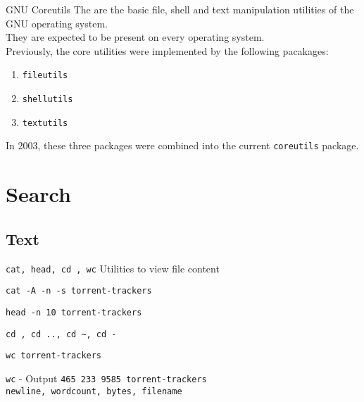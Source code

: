 \documentclass[11pt]{beamer}
\begin{document}
		\begin{frame}{GNU Coreutils}
			The {\textbf{\color{darkpurple}{GNU Core Utilities}}} are the basic file, shell and text manipulation utilities of the GNU operating system. \\
				They are expected to be present on every operating system. \\
				Previously, the core utilities were implemented by the following pacakages:
				\begin{enumerate}
				  \item \texttt{fileutils} 
				  \item \texttt{shellutils} 
				  \item \texttt{textutils}
				\end{enumerate}	
				In 2003, these three packages were combined into the current \texttt{coreutils} package.
		\end{frame}
	
	\section{Search}
		\subsection{Text}
			\begin{frame}{\texttt{cat, head, cd , wc}}
				Utilities to view file content
				\begin{example}
					\texttt{cat -A -n -s torrent-trackers}
				\end{example}
				\begin{example}
					\texttt{head -n 10 torrent-trackers}
				\end{example}
				\begin{example}
					\texttt{cd , cd .., cd \textasciitilde, cd -}
				\end{example}
				\begin{example}
					\texttt{wc torrent-trackers}
				\end{example}
				{
					\begin{alertblock}{\texttt{wc} - Output}
						\texttt{465  233 9585 torrent-trackers} \\
						\tiny \texttt{newline, wordcount, bytes, filename}
					\end{alertblock}
				}
			\end{frame}
\end{document}
